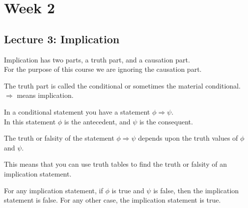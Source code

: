 \documentclass[]{article}
\begin{document}
\pagebreak
\section{Week 2}

\subsection{Lecture 3: Implication}

Implication has two parts, a truth part, and a causation part.\\ 
For the purpose of this course we are ignoring the causation part.

\begin{center} \begin{framed}
	The truth part is called the conditional or sometimes the material conditional.\\
	$\Rightarrow$ means implication.\\
\end{framed} \end{center}


In a conditional statement you have a statement $\phi \Rightarrow \psi$.\\
In this statement $\phi$ is the antecedent, and $\psi$ is the consequent.\\

\begin{center} \begin{framed}
	The truth or falsity of the statement $\phi \Rightarrow \psi$ depends upon the truth values of $\phi$ and $\psi$.\\
\end{framed} \end{center}
	
This means that you can use truth tables to find the truth or falsity of an implication statement.
	
\begin{center} \begin{framed}
	For any implication statement, if $\phi$ is true and $\psi$ is false, then the implication statement is false. For any other case, the implication statement is true.
\end{framed} \end{center}
\end{document}
